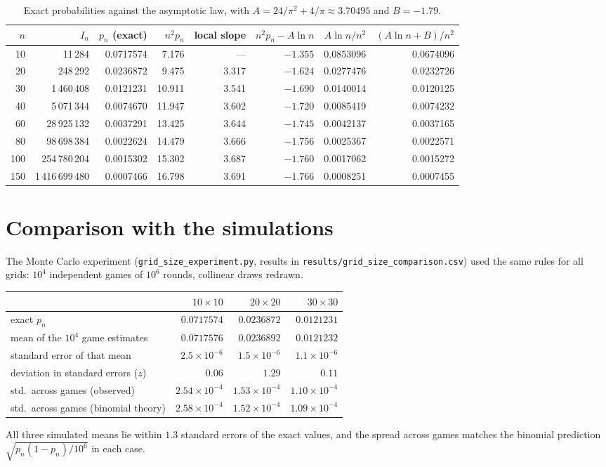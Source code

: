 \documentclass[11pt,a4paper]{article}
\theoremstyle{remark}
\begin{document}
\begin{table}[ht]
\centering
\small
\begin{tabular}{rrrrrrrr}
\toprule
$n$ & $I_n$ & $p_n$ (exact) & $n^2p_n$ & local slope & $n^2p_n-A\ln n$ &
$A\ln n/n^2$ & $(A\ln n+B)/n^2$ \\
\midrule
10 & 11\,284 & 0.0717574 & 7.176 & --- & $-1.355$ & 0.0853096 & 0.0674096 \\
20 & 248\,292 & 0.0236872 & 9.475 & 3.317 & $-1.624$ & 0.0277476 & 0.0232726 \\
30 & 1\,460\,408 & 0.0121231 & 10.911 & 3.541 & $-1.690$ & 0.0140014 & 0.0120125 \\
40 & 5\,071\,344 & 0.0074670 & 11.947 & 3.602 & $-1.720$ & 0.0085419 & 0.0074232 \\
60 & 28\,925\,132 & 0.0037291 & 13.425 & 3.644 & $-1.745$ & 0.0042137 & 0.0037165 \\
80 & 98\,698\,384 & 0.0022624 & 14.479 & 3.666 & $-1.756$ & 0.0025367 & 0.0022571 \\
100 & 254\,780\,204 & 0.0015302 & 15.302 & 3.687 & $-1.760$ & 0.0017062 & 0.0015272 \\
150 & 1\,416\,699\,480 & 0.0007466 & 16.798 & 3.691 & $-1.766$ & 0.0008251 & 0.0007455 \\
\bottomrule
\end{tabular}
\caption{Exact probabilities against the asymptotic law, with
$A=24/\pi^2+4/\pi\approx3.70495$ and $B=-1.79$.}
\label{tab:asym}
\end{table}

\section{Comparison with the simulations}

The Monte Carlo experiment (\texttt{grid\_size\_experiment.py}, results in
\texttt{results/grid\_size\_comparison.csv}) used the same rules for all grids:
$10^4$ independent games of $10^6$ rounds, collinear draws redrawn.
\begin{center}
\begin{tabular}{lrrr}
\toprule
 & $10\times10$ & $20\times20$ & $30\times30$ \\
\midrule
exact $p_n$ & $0.0717574$ & $0.0236872$ & $0.0121231$ \\
mean of the $10^4$ game estimates & $0.0717576$ & $0.0236892$ & $0.0121232$ \\
standard error of that mean & $2.5\times10^{-6}$ & $1.5\times10^{-6}$ &
  $1.1\times10^{-6}$ \\
deviation in standard errors ($z$) & $0.06$ & $1.29$ & $0.11$ \\
std.\ across games (observed) & $2.54\times10^{-4}$ & $1.53\times10^{-4}$ &
  $1.10\times10^{-4}$ \\
std.\ across games (binomial theory) & $2.58\times10^{-4}$ & $1.52\times10^{-4}$ &
  $1.09\times10^{-4}$ \\
\bottomrule
\end{tabular}
\end{center}
All three simulated means lie within $1.3$ standard errors of the exact values,
and the spread across games matches the binomial prediction
$\sqrt{p_n(1-p_n)/10^6}$ in each case.
\end{document}
